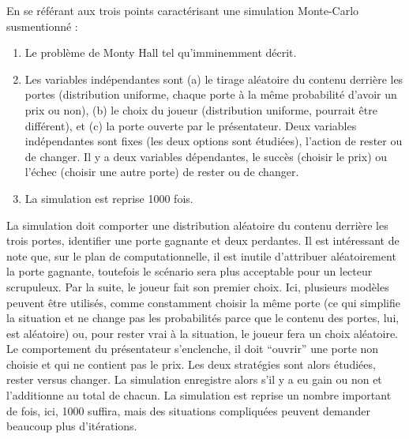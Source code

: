 \documentclass[
]{book}
\begin{document}
En se référant aux trois points caractérisant une simulation Monte-Carlo susmentionné :

\begin{enumerate}
\def\labelenumi{\arabic{enumi}.}
\item
  Le problème de Monty Hall tel qu'imminemment décrit.
\item
  Les variables indépendantes sont (a) le tirage aléatoire du contenu derrière les portes (distribution uniforme, chaque porte à la même probabilité d'avoir un prix ou non), (b) le choix du joueur (distribution uniforme, pourrait être différent), et (c) la porte ouverte par le présentateur. Deux variables indépendantes sont fixes (les deux options sont étudiées), l'action de rester ou de changer. Il y a deux variables dépendantes, le succès (choisir le prix) ou l'échec (choisir une autre porte) de rester ou de changer.
\item
  La simulation est reprise 1000 fois.
\end{enumerate}

La simulation doit comporter une distribution aléatoire du contenu derrière les trois portes, identifier une porte gagnante et deux perdantes. Il est intéressant de note que, sur le plan de computationnelle, il est inutile d'attribuer aléatoirement la porte gagnante, toutefois le scénario sera plus acceptable pour un lecteur scrupuleux. Par la suite, le joueur fait son premier choix. Ici, plusieurs modèles peuvent être utilisés, comme constamment choisir la même porte (ce qui simplifie la situation et ne change pas les probabilités parce que le contenu des portes, lui, est aléatoire) ou, pour rester vrai à la situation, le joueur fera un choix aléatoire. Le comportement du présentateur s'enclenche, il doit ``ouvrir'' une porte non choisie et qui ne contient pas le prix. Les deux stratégies sont alors étudiées, rester versus changer. La simulation enregistre alors s'il y a eu gain ou non et l'additionne au total de chacun. La simulation est reprise un nombre important de fois, ici, 1000 suffira, mais des situations compliquées peuvent demander beaucoup plus d'itérations.
\end{document}
